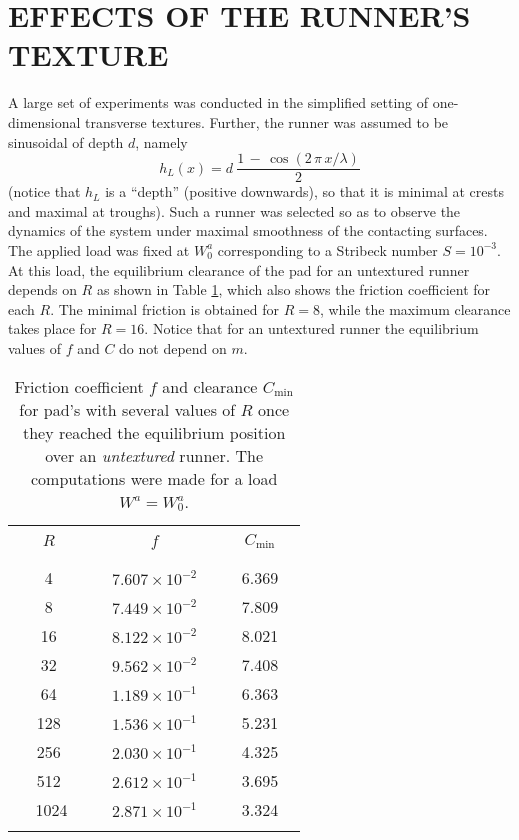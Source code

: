 \section{EFFECTS OF THE RUNNER'S TEXTURE}
\label{section4}

A large set of experiments was conducted in the simplified setting of 
one-dimensional transverse textures. Further, the runner was assumed to be sinusoidal
of depth $d$, namely
\begin{equation}
h_L(x)= d~\frac{1\,-\,\cos(2\,\pi\,x/\lambda)}{2}
\end{equation}
(notice that $h_L$ is a ``depth'' (positive downwards), so that it is minimal at
crests and maximal at troughs).
Such a runner was selected so as to observe the dynamics of the system
under maximal smoothness of the contacting surfaces. The applied
load was fixed at $W^a_0$ corresponding to a Stribeck number
$S=10^{-3}$. At this load, the equilibrium clearance of the pad for an
untextured runner depends on $R$ as shown in Table \ref{tableuntext}, which
also shows the friction coefficient for each $R$. The minimal friction
is obtained for $R = 8$, while the maximum clearance takes place for $R=16$.
Notice that for an untextured runner the equilibrium values of
$f$ and $C$ do not depend on $m$.

\begin{table} 
\begin{center}
\begin{tabular}{ccc}
\hline
 & & \\
$R$ & $f$ & $C_{\min}$ \\
& & \\
\hline
& & \\
4 &  $7.607 \times 10^{-2}$ & 6.369\\
8 &  $7.449 \times 10^{-2}$ & 7.809\\
16 &  $8.122\times 10^{-2}$ & 8.021\\
32 &  $9.562\times 10^{-2}$ & 7.408\\
64 &  $1.189\times 10^{-1}$ & 6.363\\
128 &  $1.536\times 10^{-1}$ & 5.231\\
256 &  $2.030\times 10^{-1}$ &  4.325\\
512 &  $2.612\times 10^{-1}$ & 3.695\\
$~~~~$ 1024$~~~~$ &  $~~~~2.871\times 10^{-1}~~~~$ & $~~~~$3.324$~~~~$\\
& & \\
\hline
\end{tabular}
\end{center}
\caption{Friction coefficient $f$ and clearance $C_{\min}$ for pad's with
several values of $R$ once they reached the equilibrium position
over an {\em untextured} runner. The computations were made
for a load $W^a = W^a_0$.}
\label{tableuntext}
\end{table}

